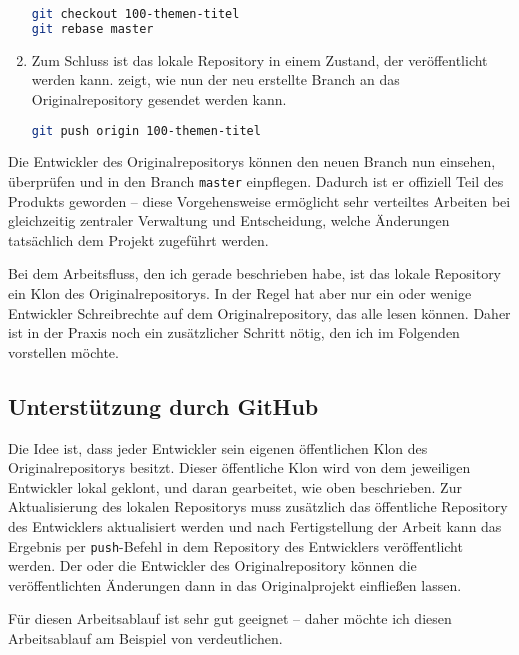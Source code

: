 \begin{enumerate}
\begin{lstlisting}[language=sh,caption={Mit git ein \texttt{rebase} auf einen Branch ausführen},label=\lstlbl{git-neubranch-rebase}]
git checkout 100-themen-titel
git rebase master
\end{lstlisting}

\item Zum Schluss ist das lokale Repository in einem Zustand, der veröffentlicht werden kann.  zeigt, wie nun der neu erstellte Branch an das Originalrepository gesendet werden kann.
\begin{lstlisting}[language=sh,caption={Mit git einen lokalen Branch an das Originalrepository senden},label=\lstlbl{git-push}]
git push origin 100-themen-titel
\end{lstlisting}
\end{enumerate}

Die Entwickler des Originalrepositorys können den neuen Branch nun einsehen, überprüfen und in den Branch \texttt{master} einpflegen. Dadurch ist er offiziell Teil des Produkts geworden -- diese Vorgehensweise ermöglicht sehr verteiltes Arbeiten bei gleichzeitig zentraler Verwaltung und Entscheidung, welche Änderungen tatsächlich dem Projekt zugeführt werden.

Bei dem Arbeitsfluss, den ich gerade beschrieben habe, ist das lokale Repository ein Klon des Originalrepositorys. In der Regel hat aber nur ein oder wenige Entwickler Schreibrechte auf dem Originalrepository, das alle lesen können. Daher ist in der Praxis noch ein zusätzlicher Schritt nötig, den ich im Folgenden vorstellen möchte.

\subsection{Unterstützung durch GitHub}
Die Idee ist, dass jeder Entwickler sein eigenen öffentlichen Klon des Originalrepositorys besitzt. Dieser öffentliche Klon wird von dem jeweiligen Entwickler lokal geklont, und daran gearbeitet, wie oben beschrieben. Zur Aktualisierung des lokalen Repositorys muss zusätzlich das öffentliche Repository des Entwicklers aktualisiert werden und nach Fertigstellung der Arbeit kann das Ergebnis per \texttt{push}-Befehl in dem Repository des Entwicklers veröffentlicht werden. Der oder die Entwickler des Originalrepository können die veröffentlichten Änderungen dann in das Originalprojekt einfließen lassen.

Für diesen Arbeitsablauf ist  sehr gut geeignet -- daher möchte ich diesen Arbeitsablauf am Beispiel von  verdeutlichen.

